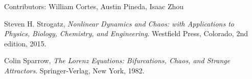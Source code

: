 \documentclass{report}
\begin{document}
Contributors: William Cortes, Austin Pineda, Isaac Zhou

\begin{thebibliography}{9}
  Steven H. Strogatz,
  \emph{Nonlinear Dynamics and Chaos: with Applications to Physics, Biology,
Chemistry, and Engineering}.
  Westfield Press, Colorado,
  2nd edition,
  2015.

  Colin Sparrow,
  \emph{The Lorenz Equations: Bifurcations, Chaos, and Strange Attractors}.
  Springer-Verlag, New York,
  1982.
\end{thebibliography}
\end{document}
